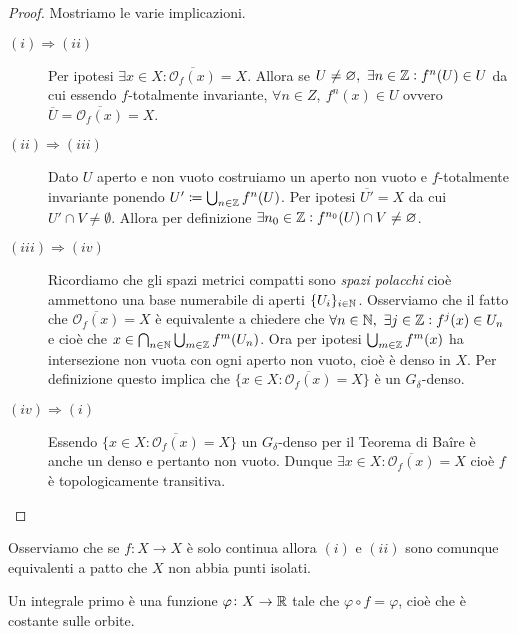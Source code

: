 \begin{proof}
    Mostriamo le varie implicazioni.
    \begin{description}
        \item[$ (i) \Rightarrow (ii) $] Per ipotesi $ \exists x \in X : \overline{\mathcal{O}_f(x)} = X $. Allora se $ U \neq \varnothing, \ \exists n \in \mathbb{Z} : f^{n}(U) \in U $ da cui essendo $ f $-totalmente invariante, $ \forall n \in Z, \ f^n(x) \in U $ ovvero $ \overline{U} = \overline{\mathcal{O}_f(x)} = X $.
        \item[$ (ii) \Rightarrow (iii) $] Dato $ U $ aperto e non vuoto costruiamo un aperto non vuoto e $ f $-totalmente invariante ponendo $ U' \coloneqq \bigcup_{n \in \mathbb{Z}} f^n(U) $. Per ipotesi $ \overline{U'} = X $ da cui $ U' \cap V \neq \emptyset $. Allora per definizione $ \exists n_0 \in \mathbb{Z} : f^{n_0}(U) \cap V \neq \varnothing $.
        \item[$ (iii) \Rightarrow (iv) $] Ricordiamo che gli spazi metrici compatti sono \emph{spazi polacchi} cioè ammettono una base numerabile di aperti $ \{U_i\}_{i \in \mathbb{N}} $. Osserviamo che il fatto che $ \overline{\mathcal{O}_f(x)} = X $ è equivalente a chiedere che $ \forall n \in \mathbb{N}, \ \exists j \in \mathbb{Z} : f^j(x) \in U_n $ e cioè che $ x \in \bigcap_{n \in \mathbb{N}} \bigcup_{m \in \mathbb{Z}} f^{m}(U_n) $. Ora per ipotesi $ \bigcup_{m \in \mathbb{Z}} f^m(x) $ ha intersezione non vuota con ogni aperto non vuoto, cioè è denso in $ X $. Per definizione questo implica che $ \{x \in X : \overline{\mathcal{O}_f(x)} = X\} $ è un $ G_\delta $-denso.
        \item[$ (iv) \Rightarrow (i) $] Essendo $ \{x \in X : \overline{\mathcal{O}_f(x)} = X\} $ un $ G_\delta $-denso per il Teorema di Ba\^{i}re è anche un denso e pertanto non vuoto. Dunque $ \exists x \in X : \overline{\mathcal{O}_f(x)} = X $ cioè $ f $ è topologicamente transitiva. \qedhere
    \end{description}
\end{proof}

Osserviamo che se $ f \colon X \to X $ è solo continua allora $ (i) $ e $ (ii) $ sono comunque equivalenti a patto che $ X $ non abbia punti isolati. \\

\begin{definition}
    Un integrale primo è una funzione $ \varphi \colon X \to \mathbb{R} $ tale che $ \varphi \circ f = \varphi $, cioè che è costante sulle orbite.
\end{definition}

